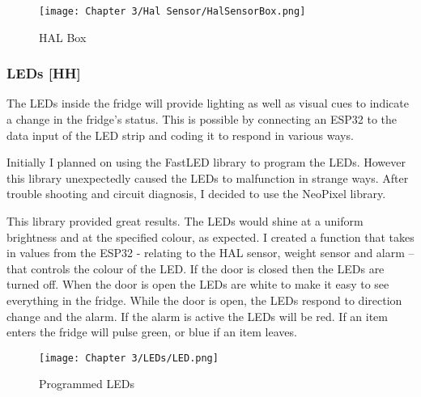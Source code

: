 \begin{figure}[H]        
    \centering
    \texttt{[image: Chapter 3/Hal Sensor/HalSensorBox.png]}
    \caption{HAL Box}
    \label{fig:haldoor}
\end{figure} 

\subsubsection{LEDs [HH]}

The LEDs inside the fridge will provide lighting as well as visual cues to indicate a change in the fridge's status.
This is possible by connecting an ESP32 to the data input of the LED strip and coding it to respond in various ways.

Initially I planned on using the FastLED library to program the LEDs.
However this library unexpectedly caused the LEDs to malfunction in strange ways.
After trouble shooting and circuit diagnosis, I decided to use the NeoPixel library.

This library provided great results.
The LEDs would shine at a uniform brightness and at the specified colour, as expected.
I created a function that takes in values from the ESP32 - relating to the HAL sensor, weight sensor and alarm – that controls the colour of the LED.
If the door is closed then the LEDs are turned off.
When the door is open the LEDs are white to make it easy to see everything in the fridge.
While the door is open, the LEDs respond to direction change and the alarm.
If the alarm is active the LEDs will be red.
If an item enters the fridge will pulse green, or blue if an item leaves.

\begin{figure}[H]        
    \centering
    \texttt{[image: Chapter 3/LEDs/LED.png]}
    \caption{Programmed LEDs}
\end{figure} 